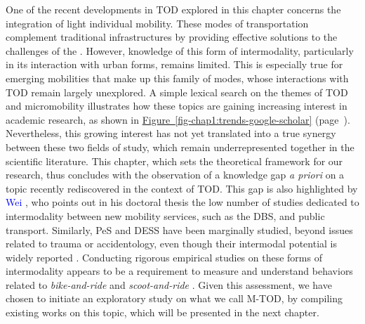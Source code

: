 \begin{refsegment}
One of the recent developments in \acrshort{TOD} explored in this chapter concerns the integration of light individual mobility. These modes of transportation complement traditional infrastructures by providing effective solutions to the challenges of the . However, knowledge of this form of intermodality, particularly in its interaction with urban forms, remains limited. This is especially true for emerging mobilities that make up this family of modes, whose interactions with \acrshort{TOD} remain largely unexplored. A simple lexical search on the themes of \acrshort{TOD} and micromobility illustrates how these topics are gaining increasing interest in academic research, as shown in \hyperref[fig-chap1:trends-google-scholar]{Figure~\ref{fig-chap1:trends-google-scholar}} (page~\pageref{fig-chap1:trends-google-scholar}). Nevertheless, this growing interest has not yet translated into a true synergy between these two fields of study, which remain underrepresented together in the scientific literature. This chapter, which sets the theoretical framework for our research, thus concludes with the observation of a knowledge gap \textsl{a priori} on a topic recently rediscovered in the context of \acrshort{TOD}. This gap is also highlighted by \textcolor{blue}{Wei} \textcolor{blue}{\textcite[90]{kang_university_2020}}, who points out in his doctoral thesis the low number of studies dedicated to intermodality between new mobility services, such as the \acrshort{DBS}, and public transport. Similarly, \acrshort{PeS} and \acrshort{DESS} have been marginally studied, beyond issues related to trauma or accidentology, even though their intermodal potential is widely reported \textcolor{blue}{\autocite{richer_dossier_2021}}. Conducting rigorous empirical studies on these forms of intermodality appears to be a requirement to measure and understand behaviors related to \textsl{bike-and-ride} and \textsl{scoot-and-ride} \textcolor{blue}{\autocite[13]{bortoli_consequential_2020}}. Given this assessment, we have chosen to initiate an exploratory study on what we call \acrshort{M-TOD}, by compiling existing works on this topic, which will be presented in the next chapter.%

     \newpage
     

\end{refsegment}
